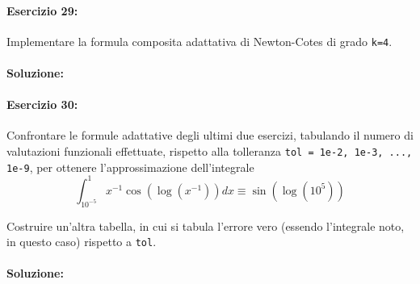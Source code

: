 \documentclass[12pt]{article}
\begin{document}
\paragraph{Esercizio 29:}
Implementare la formula composita adattativa di Newton-Cotes di grado \texttt{k=4}.

\paragraph{Soluzione:}


\paragraph{Esercizio 30:}
Confrontare le formule adattative degli ultimi due esercizi, tabulando il numero
di valutazioni funzionali effettuate, rispetto alla tolleranza \texttt{tol = 1e-2, 1e-3, ..., 1e-9}, per
ottenere l’approssimazione dell’integrale \\

$$\int_{10^{-5}}^{1}x^{-1}\cos(\log(x^{-1}))dx\equiv\sin(\log(10^{5}))$$

Costruire un’altra tabella, in cui si tabula l’errore vero (essendo l’integrale noto, in questo caso)
rispetto a \texttt{tol}.
\paragraph{Soluzione:}
\end{document}
